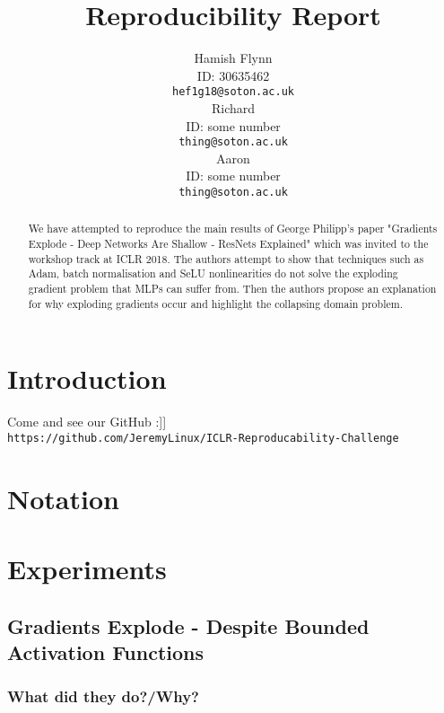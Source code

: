 \documentclass{article} %
\title{Reproducibility Report}
\author{Hamish Flynn\\
ID: 30635462\\
\texttt{hef1g18@soton.ac.uk}\\
\And
Richard\\
ID: some number\\
\texttt{thing@soton.ac.uk}\\
\And
Aaron\\
ID: some number\\
\texttt{thing@soton.ac.uk}}
\begin{document}
\maketitle

\begin{abstract}
We have attempted to reproduce the main results of George Philipp's paper "Gradients Explode - Deep Networks Are Shallow - ResNets Explained" which was invited to the workshop track at ICLR 2018. The authors attempt to show that techniques such as Adam, batch normalisation and SeLU nonlinearities do not solve the exploding gradient problem that MLPs can suffer from. Then the authors propose an explanation for why exploding gradients occur and highlight the collapsing domain problem.
\end{abstract}

\section{Introduction}

Come and see our GitHub :]]\\
\texttt{https://github.com/JeremyLinux/ICLR-Reproducability-Challenge}

\vspace{5mm}

\section{Notation}



\vspace{5mm}

\section{Experiments}



\vspace{5mm}

\subsection{Gradients Explode - Despite Bounded Activation Functions}

\subsubsection{What did they do?/Why?}
\end{document}
